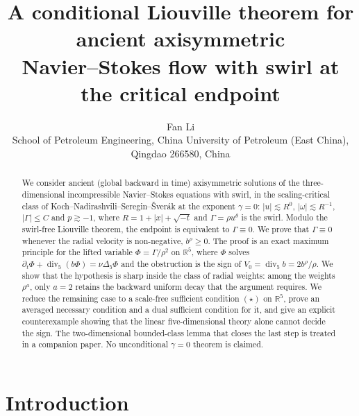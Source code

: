 \documentclass[11pt]{article}
\title{A conditional Liouville theorem for ancient axisymmetric\\
Navier--Stokes flow with swirl at the critical endpoint}
\author{Fan Li\\[8pt]
{\small School of Petroleum Engineering, China University of Petroleum (East China),}\\[2pt]
{\small Qingdao 266580, China}}
\date{}
\theoremstyle{definition}
\newcommand{\R}{\mathbb{R}}
\newcommand{\Div}{\operatorname{div}}
\begin{document}
\maketitle

\begin{abstract}
We consider ancient (global backward in time) axisymmetric solutions of the
three-dimensional incompressible Navier--Stokes equations with swirl, in the
scaling-critical class of Koch--Nadirashvili--Seregin--\v{S}ver\'ak at the
exponent $\gamma=0$: $|u|\lesssim R^{0}$, $|\omega|\lesssim R^{-1}$,
$|\Gamma|\le C$ and $p\gtrsim-1$, where $R=1+|x|+\sqrt{-t}$ and
$\Gamma=\rho u^\theta$ is the swirl. Modulo the swirl-free Liouville theorem,
the endpoint is equivalent to $\Gamma\equiv0$. We prove that $\Gamma\equiv0$
whenever the radial velocity is non-negative, $b^\rho\ge0$. The proof is an
exact maximum principle for the lifted variable $\Phi=\Gamma/\rho^2$ on
$\R^5$, where $\Phi$ solves $\partial_t\Phi+\Div_5(b\Phi)=\nu\Delta_5\Phi$ and
the obstruction is the sign of $V_0=\Div_5b=2b^\rho/\rho$. We show that the
hypothesis is sharp inside the class of radial weights: among the weights
$\rho^a$, only $a=2$ retains the backward uniform decay that the argument
requires. We reduce the remaining case to a scale-free sufficient condition
$(\star)$ on $\R^5$, prove an averaged necessary condition and a dual
sufficient condition for it, and give an explicit counterexample showing that
the linear five-dimensional theory alone cannot decide the sign. The
two-dimensional bounded-class lemma that closes the last step is treated in a
companion paper. No unconditional $\gamma=0$ theorem is claimed.
\end{abstract}

\section{Introduction}
\end{document}
